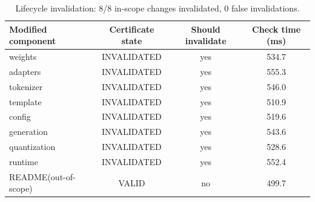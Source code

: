 \begin{table}[t]
\centering
\caption{Lifecycle invalidation: 8/8 in-scope changes invalidated, 0 false invalidations.}
\label{tab:invalidation}
\footnotesize
\begin{tabular}{lccc}
\toprule
Modified component & Certificate state & Should invalidate & Check time (ms) \\
\midrule
weights & INVALIDATED & yes & 534.7 \\
adapters & INVALIDATED & yes & 555.3 \\
tokenizer & INVALIDATED & yes & 546.0 \\
template & INVALIDATED & yes & 510.9 \\
config & INVALIDATED & yes & 519.6 \\
generation & INVALIDATED & yes & 543.6 \\
quantization & INVALIDATED & yes & 528.6 \\
runtime & INVALIDATED & yes & 552.4 \\
README(out-of-scope) & VALID & no & 499.7 \\
\bottomrule
\end{tabular}
\end{table}